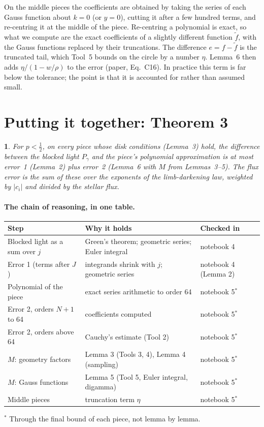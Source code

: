 \documentclass[11pt,a4paper]{article}
\newtheorem*{paperthm}{\paperthmname}
\newcommand{\paperthmname}{}
\theoremstyle{remark}
\begin{document}
On the middle pieces the coefficients are obtained by taking the series of each Gauss function
about $k=0$ (or $y=0$), cutting it after a few hundred terms, and re-centring it at the middle of the
piece. Re-centring a polynomial is exact, so what we compute are the exact coefficients of a
slightly different function $\tilde f$, with the Gauss functions replaced by their truncations. The
difference $e=f-\tilde f$ is the truncated tail, which Tool~5 bounds on the circle by a number
$\eta$. Lemma~6 then adds $\eta/(1-w/\rho)$ to the error (paper, Eq.~C16). In practice this term is
far below the tolerance; the point is that it is accounted for rather than assumed small.

\section{Putting it together: Theorem 3}

\renewcommand{\paperthmname}{Theorem 3 (as in the paper, in words)}
\begin{paperthm}
For $p<\tfrac12$, on every piece whose disk conditions (Lemma~3) hold, the difference between the
blocked light $P_\gamma$ and the piece's polynomial approximation is at most error~1 (Lemma~2) plus
error~2 (Lemma~6 with $M$ from Lemmas~3--5). The flux error is the sum of these over the exponents
of the limb-darkening law, weighted by $|c_i|$ and divided by the stellar flux.
\end{paperthm}

\paragraph{The chain of reasoning, in one table.}
\begin{center}
\begin{tabular}{p{4.6cm}p{5.4cm}p{3.6cm}}
\toprule
Step & Why it holds & Checked in\\
\midrule
Blocked light as a sum over $j$ & Green's theorem; geometric series; Euler integral & notebook 4\\
Error 1 (terms after $J$) & integrands shrink with $j$; geometric series & notebook 4 (Lemma 2)\\
Polynomial of the piece & exact series arithmetic to order 64 & notebook 5$^*$\\
Error 2, orders $N+1$ to 64 & coefficients computed & notebook 5$^*$\\
Error 2, orders above 64 & Cauchy's estimate (Tool 2) & notebook 5$^*$\\
$M$: geometry factors & Lemma 3 (Tools 3, 4), Lemma 4 (sampling) & notebook 5$^*$\\
$M$: Gauss functions & Lemma 5 (Tool 5, Euler integral, digamma) & notebook 5$^*$\\
Middle pieces & truncation term $\eta$ & notebook 5$^*$\\
\bottomrule
\end{tabular}
\par\smallskip\footnotesize $^*$ Through the final bound of each piece, not lemma by lemma.
\end{center}
\end{document}
